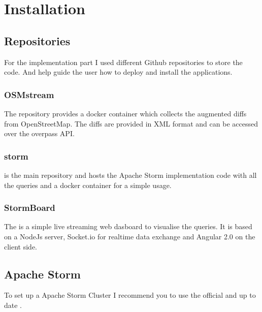 \chapter{Installation}
\newpage

\section{Repositories}
For the implementation part I used different Github repositories to store the code.
And help guide the user how to deploy and install the applications.

\subsection{OSMstream}
The    repository provides a docker container which collects the augmented diffs from OpenStreetMap.
The diffs are provided in XML format and can be accessed over the overpass API.

\subsection{storm}
 is the main repository and hosts the Apache Storm implementation code with all the queries and a docker container for a simple usage.

\subsection{StormBoard}
The  is a simple live streaming web dasboard to visualise the queries.
It is based on a NodeJs server, Socket.io for realtime data exchange and Angular 2.0 on the client side.

\section{Apache Storm}
To set up a Apache Storm Cluster I recommend you to use the official and up to date
.
